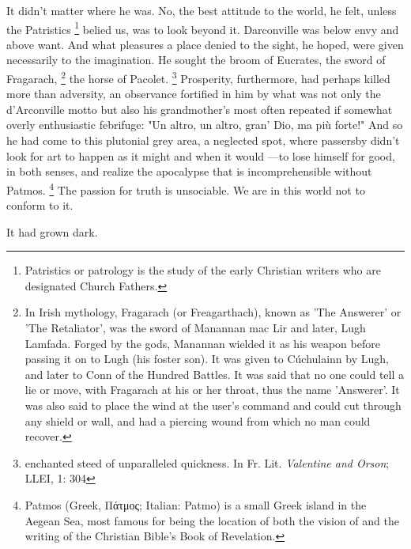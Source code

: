   It didn't matter where he was. No, the best attitude to the world, he felt,
unless the Patristics 
\footnote{Patristics or patrology is the study of the early Christian writers
who are designated Church Fathers.} 
belied 
us, was to look beyond it. Darconville was below
envy and above want. And what pleasures a place denied to the sight, he hoped,
were given necessarily to the imagination. He sought the broom of Eucrates, 
the sword of Fragarach, 
\footnote{ In Irish mythology, Fragarach (or Freagarthach), known as 'The
Answerer' or 'The Retaliator', was the sword of Manannan mac Lir and later, Lugh
Lamfada. Forged by the gods, Manannan wielded it as his weapon before passing 
it on to Lugh (his foster son). It was given to Cúchulainn by Lugh, and later 
to Conn of the Hundred Battles. It was said that no one could tell a lie or 
move, with Fragarach at his or her throat, thus the name 'Answerer'. It was 
also said to place the wind at the user's command and could cut through any 
shield or wall, and had a piercing wound from which no man could recover.
}
the horse of Pacolet. 
\footnote{enchanted steed of unparalleled quickness. In Fr. Lit. 
\textit{Valentine and Orson}; LLEI, 1: 304
}
Prosperity, furthermore, had perhaps
killed more than adversity, an observance fortified in him by what was not only
the d'Arconville motto but also his grandmother's most often repeated if
somewhat overly enthusiastic febrifuge: 
"Un altro, un altro, gran' Dio, ma più forte!" And so he had come to this 
plutonial grey area, a neglected spot, where
passersby didn't look for art to happen as it might and when it would ---to lose
himself for good, in both senses, and realize the apocalypse 
that is incomprehensible without Patmos. 
\footnote{ Patmos (Greek, Πάτμος; Italian: Patmo) is a small Greek island 
in the Aegean Sea, most famous for being the location of both the vision of 
and the writing of the Christian Bible's Book of Revelation.
}
The passion for truth is unsociable. We are in
this world not to conform to it.

  It had grown dark.

